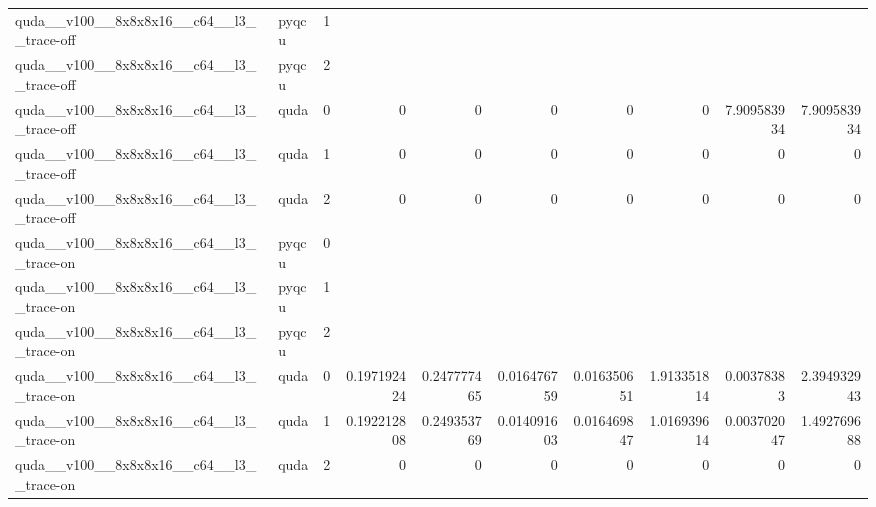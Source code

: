 \begin{table}[htbp]
\begin{tabular}{@{}llrrrrrrrr@{}}
quda\_\_v100\_\_8x8x8x16\_\_c64\_\_l3\_\_trace-off & pyqcu & 1 &  &  &  &  &  &  &  \\
quda\_\_v100\_\_8x8x8x16\_\_c64\_\_l3\_\_trace-off & pyqcu & 2 &  &  &  &  &  &  &  \\
quda\_\_v100\_\_8x8x8x16\_\_c64\_\_l3\_\_trace-off & quda & 0 & 0 & 0 & 0 & 0 & 0 & 7.909583934 & 7.909583934 \\
quda\_\_v100\_\_8x8x8x16\_\_c64\_\_l3\_\_trace-off & quda & 1 & 0 & 0 & 0 & 0 & 0 & 0 & 0 \\
quda\_\_v100\_\_8x8x8x16\_\_c64\_\_l3\_\_trace-off & quda & 2 & 0 & 0 & 0 & 0 & 0 & 0 & 0 \\
quda\_\_v100\_\_8x8x8x16\_\_c64\_\_l3\_\_trace-on & pyqcu & 0 &  &  &  &  &  &  &  \\
quda\_\_v100\_\_8x8x8x16\_\_c64\_\_l3\_\_trace-on & pyqcu & 1 &  &  &  &  &  &  &  \\
quda\_\_v100\_\_8x8x8x16\_\_c64\_\_l3\_\_trace-on & pyqcu & 2 &  &  &  &  &  &  &  \\
quda\_\_v100\_\_8x8x8x16\_\_c64\_\_l3\_\_trace-on & quda & 0 & 0.197192424 & 0.247777465 & 0.016476759 & 0.016350651 & 1.913351814 & 0.00378383 & 2.394932943 \\
quda\_\_v100\_\_8x8x8x16\_\_c64\_\_l3\_\_trace-on & quda & 1 & 0.192212808 & 0.249353769 & 0.014091603 & 0.016469847 & 1.016939614 & 0.003702047 & 1.492769688 \\
quda\_\_v100\_\_8x8x8x16\_\_c64\_\_l3\_\_trace-on & quda & 2 & 0 & 0 & 0 & 0 & 0 & 0 & 0 \\
\bottomrule
\end{tabular}
\end{table}


